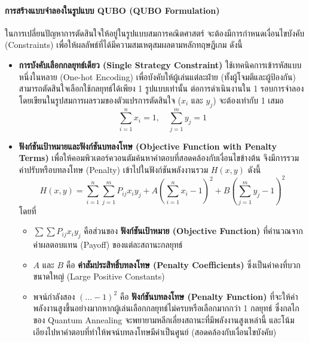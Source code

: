 \paragraph{การสร้างแบบจำลองในรูปแบบ QUBO (QUBO Formulation)}
ในการเปลี่ยนปัญหาการตัดสินใจให้อยู่ในรูปแบบสมการคณิตศาสตร์ จะต้องมีการกำหนดเงื่อนไขบังคับ (Constraints) เพื่อให้ผลลัพธ์ที่ได้มีความสมเหตุสมผลตามหลักทฤษฎีเกม ดังนี้

\begin{itemize}
    \item \textbf{การบังคับเลือกกลยุทธ์เดียว (Single Strategy Constraint)} ใช้เทคนิคการเข้ารหัสแบบหนึ่งในหลาย (One-hot Encoding) เพื่อบังคับให้ผู้เล่นแต่ละฝ่าย (ทั้งผู้โจมตีและผู้ป้องกัน) สามารถตัดสินใจเลือกใช้กลยุทธ์ได้เพียง 1 รูปแบบเท่านั้น ต่อการดำเนินงานใน 1 รอบการจำลอง โดยเขียนในรูปสมการผลรวมของตัวแปรการตัดสินใจ ($x_i$ และ $y_j$) จะต้องเท่ากับ 1 เสมอ
    \begin{equation}
    \sum_{i=1}^{n} x_i = 1, \quad \sum_{j=1}^{m} y_j = 1
    \end{equation}

    \item \textbf{ฟังก์ชันเป้าหมายและฟังก์ชันบทลงโทษ (Objective Function with Penalty Terms)} เพื่อให้คอมพิวเตอร์ควอนตัมค้นหาคำตอบที่สอดคล้องกับเงื่อนไขข้างต้น จึงมีการรวมค่าปรับหรือบทลงโทษ (Penalty) เข้าไปในฟังก์ชันพลังงานรวม $H(x,y)$ ดังนี้
    \begin{equation}
    H(x,y) = \sum_{i=1}^{n} \sum_{j=1}^{m} P_{ij} x_i y_j + A\left(\sum_{i=1}^{n} x_i - 1\right)^2 + B\left(\sum_{j=1}^{m} y_j - 1\right)^2
    \end{equation}
    โดยที่
    \begin{itemize}
        \item $\sum \sum P_{ij} x_i y_j$ คือส่วนของ \textbf{ฟังก์ชันเป้าหมาย (Objective Function)} ที่คำนวณจากค่าผลตอบแทน (Payoff) ของแต่ละสถานะกลยุทธ์
        \item $A$ และ $B$ คือ \textbf{ค่าสัมประสิทธิ์บทลงโทษ (Penalty Coefficients)} ซึ่งเป็นค่าคงที่บวกขนาดใหญ่ (Large Positive Constants) 
        \item พจน์กำลังสอง $(...-1)^2$ คือ \textbf{ฟังก์ชันบทลงโทษ (Penalty Function)} ที่จะให้ค่าพลังงานสูงขึ้นอย่างมากหากผู้เล่นเลือกกลยุทธ์ไม่ครบหรือเลือกมากกว่า 1 กลยุทธ์ ซึ่งกลไกของ Quantum Annealing จะพยายามหลีกเลี่ยงสถานะที่มีพลังงานสูงเหล่านี้ และโน้มเอียงไปหาคำตอบที่ทำให้พจน์บทลงโทษมีค่าเป็นศูนย์ (สอดคล้องกับเงื่อนไขบังคับ)
    \end{itemize}
\end{itemize}

